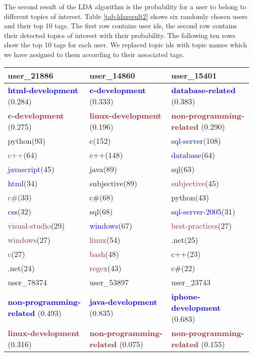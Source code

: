 The second result of the LDA algorithm is the probability for a user to belong to different topics of interest. 
Table \ref{tab:ldaresult2} shows six randomly chosen users and their top 10 tags. The first row contains user ids, the second row contains their detected topics of interest with their probability. The following ten rows show the top 10 tags for each user. We replaced topic ids with topic names which we have assigned to them according to their associated tags.
\begin{sidewaystable}%
\centering
\begin{tabular}{|l|l|l|}
\hline
user\_21886&user\_14860&user\_15401\\
\hline
\textbf{\textcolor{blue}{html-development}} (0.284)  & \textbf{\textcolor{blue}{c-development}} (0.333) &\textbf{\textcolor{blue}{database-related}} (0.383)\\
 \textbf{\textcolor{brown}{c-development}} (0.275) &  \textbf{\textcolor{brown}{linux-development}} (0.196)& \textbf{\textcolor{brown}{non-programming-related}} (0.290)\\

\hline
python(93)&\textcolor{blue}{c}(152)&\textcolor{blue}{sql-server}(108)\\
\textcolor{brown}{c++}(64)&\textcolor{blue}{c++}(148)&\textcolor{blue}{database}(64)\\
\textcolor{blue}{javascript}(45)&java(89)&\textcolor{blue}{sql}(63)\\
\textcolor{blue}{html}(34)&subjective(89)&\textcolor{brown}{subjective}(45)\\
\textcolor{brown}{c\#}(33)&c\#(68)&python(43)\\
\textcolor{blue}{css}(32)&sql(68)&\textcolor{blue}{sql-server-2005}(31)\\
\textcolor{brown}{visual-studio}(29)&\textcolor{blue}{windows}(67)&\textcolor{brown}{best-practices}(27)\\
\textcolor{brown}{windows}(27)&\textcolor{brown}{linux}(54)&.net(25)\\
\textcolor{brown}{c}(27)&\textcolor{brown}{bash}(48)&c++(23)\\
.net(24)&\textcolor{brown}{regex}(43)&c\#(22)\\
\hline
\hline
user\_78374&user\_53897&user\_23743\\
\hline
\textbf{\textcolor{blue}{non-programming-related}} (0.493)&\textbf{\textcolor{blue}{java-development}} (0.835)&\textbf{\textcolor{blue}{iphone-development}} (0.683)\\
\textbf{\textcolor{brown}{linux-development}} (0.316)&\textbf{\textcolor{brown}{non-programming-related}} (0.075)& \textbf{\textcolor{brown}{non-programming-related}} (0.155)\\


\end{tabular}
\end{sidewaystable}
